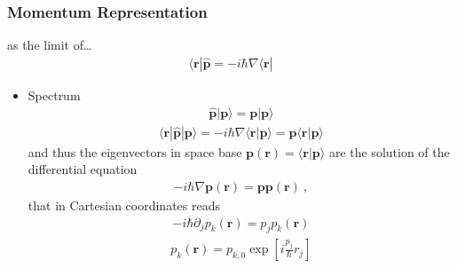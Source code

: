 \documentclass[letterpaper,10pt,english]{jupyterBook}
\begin{document}
\subsubsection{Momentum Representation}
\label{\detokenize{ch/quantum-mechanics/intro:momentum-representation}}
\sphinxAtStartPar
{} as the limit of… 
\begin{equation*}
\begin{split}\langle \mathbf{r} | \hat{\mathbf{p}} = - i \hbar \nabla \langle \mathbf{r} | \end{split}
\end{equation*}\begin{itemize}
\item {} 
\sphinxAtStartPar
Spectrum
\begin{equation*}
\begin{split}\hat{\mathbf{p}} | \mathbf{p} \rangle = \mathbf{p} | \mathbf{p} \rangle\end{split}
\end{equation*}\begin{equation*}
\begin{split}\langle \mathbf{r} | \hat{\mathbf{p}} | \mathbf{p} \rangle = - i \hbar \nabla \langle \mathbf{r} | \mathbf{p} \rangle = \mathbf{p} \langle \mathbf{r} | \mathbf{p} \rangle\end{split}
\end{equation*}
\sphinxAtStartPar
and thus the eigenvectors in space base \(\mathbf{p}(\mathbf{r}) = \langle \mathbf{r} | \mathbf{p} \rangle\) are the solution of the differential equation
\begin{equation*}
\begin{split}- i \hbar \nabla \mathbf{p}(\mathbf{r}) = \mathbf{p} \mathbf{p}(\mathbf{r}) \ ,\end{split}
\end{equation*}
\sphinxAtStartPar
that in Cartesian coordinates reads
\begin{equation*}
\begin{split}- i \hbar \partial_j p_k(\mathbf{r}) = p_j p_k(\mathbf{r})\end{split}
\end{equation*}\begin{equation*}
\begin{split}p_k(\mathbf{r}) = p_{k,0} \exp \left[ i \frac{p_j}{\hbar} r_j \right]\end{split}

\end{equation*}
\end{itemize}
\end{document}
